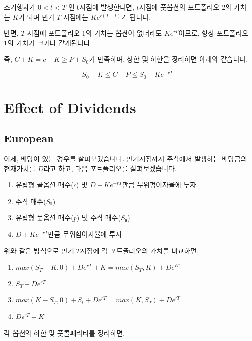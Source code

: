 \documentclass[
  letterpaper,
  DIV=11,
  numbers=noendperiod]{scrreprt}
\providecommand{\tightlist}{%
  \setlength{\itemsep}{0pt}\setlength{\parskip}{0pt}}\usepackage{longtable,booktabs,array}
\begin{document}
조기행사가 \(0<t<T\) 인 t시점에 발생한다면, \(t\)시점에 풋옵션의
포트폴리오 2의 가치는 \(K\)가 되며 만기 \(T\) 시점에는 \(Ke^{r(T-t)}\)가
됩니다.

반면, \(T\) 시점에 포트폴리오 1의 가치는 옵션이 없더라도
\(Ke^{rT}\)이므로, 항상 포트폴리오 1의 가치가 크거나 같게됩니다.

즉, \(C+K=c+K\geq P+S_0\)가 만족하며, 상한 및 하한을 정리하면 아래와
같습니다.

\[S_0-K\leq C-P\leq S_0-Ke^{-rT}\]

\section*{Effect of Dividends}\label{effect-of-dividends}


\subsection*{European}\label{european-1}

이제, 배당이 있는 경우를 살펴보겠습니다. 만기시점까지 주식에서 발생하는
배당금의 현재가치를 \(D\)라고 하고, 다음 포트폴리오를 살펴보겠습니다.

\begin{enumerate}
\def\labelenumi{\arabic{enumi}.}
\tightlist
\item
  유럽형 콜옵션 매수(\(c\)) 및 \(D+Ke^{-rT}\)만큼 무위험이자율에 투자
\item
  주식 매수(\(S_0\))
\item
  유럽형 풋옵션 매수(\(p\)) 및 주식 매수(\(S_0\))
\item
  \(D+Ke^{-rT}\)만큼 무위험이자율에 투자
\end{enumerate}

위와 같은 방식으로 만기 \(T\)시점에 각 포트폴리오의 가치를 비교하면,

\begin{enumerate}
\def\labelenumi{\arabic{enumi}.}
\tightlist
\item
  \(max(S_T-K,0)+De^{rT}+K=max(S_T,K)+De^{rT}\)
\item
  \(S_T+De^{rT}\)
\item
  \(max(K-S_T,0)+S_t+De^{rT}=max(K,S_T)+De^{rT}\)
\item
  \(De^{rT}+K\)
\end{enumerate}

각 옵션의 하한 및 풋콜패리티를 정리하면,
\end{document}

